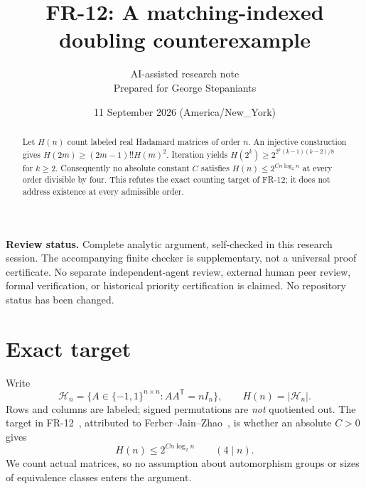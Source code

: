 \documentclass[11pt,a4paper]{article}
\title{\textbf{FR-12: A matching-indexed\\doubling counterexample}}
\author{AI-assisted research note\\\small Prepared for George Stepaniants}
\date{11 September 2026 (America/New\_York)}
\newcommand{\HH}{\mathcal H}
\begin{document}
\maketitle
\begin{abstract}
Let $H(n)$ count labeled real Hadamard matrices of order $n$. An injective
construction gives $H(2m)\ge(2m-1)!!H(m)^2$. Iteration yields
$H(2^k)\ge 2^{2^k(k-1)(k-2)/8}$ for $k\ge2$.
Consequently no absolute constant $C$ satisfies $H(n)\le2^{Cn\log_2 n}$
at every order divisible by four. This refutes the exact counting target of
FR-12; it does not address existence at every admissible order.
\end{abstract}
\noindent\textbf{Review status.} Complete analytic argument, self-checked in this
research session. The accompanying finite checker is supplementary, not a
universal proof certificate. No separate independent-agent review, external
human peer review, formal verification, or historical priority certification
is claimed. No repository status has been changed.

\section{Exact target}
Write
\[
 \HH_n=\{A\in\{-1,1\}^{n\times n}:AA^{\mathsf T}=nI_n\},
 \qquad H(n)=|\HH_n|.
\]
Rows and columns are labeled; signed permutations are \emph{not} quotiented
out. The target in FR-12~\cite{catalog}, attributed to
Ferber--Jain--Zhao~\cite{FJZ}, is whether an absolute $C>0$ gives
\begin{equation}\label{eq:target}
 H(n)\le 2^{Cn\log_2 n}\qquad(4\mid n).
\end{equation}
We count actual matrices, so no assumption about automorphism groups or
sizes of equivalence classes enters the argument.
\end{document}
